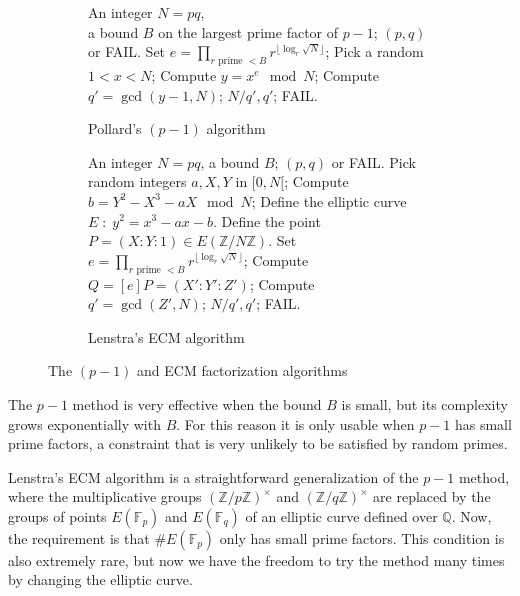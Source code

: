 \documentclass[10pt]{article}
\theoremstyle{plain}
\theoremstyle{definition}
\def\F{\ensuremath{\mathbb{F}}}
\begin{document}
\begin{figure}
  \begin{subfigure}{0.45\textwidth}
    \begin{algorithmic}[1]
      \REQUIRE An integer $N=pq$,\\
      a bound $B$ on the largest prime factor of $p-1$;
      \ENSURE $(p,q)$ or FAIL.
      \STATE Set $e = \prod_{r \text{ prime } < B} r^{\lfloor\log_r\sqrt{N}\rfloor}$;
      \STATE Pick a random $1 < x < N$;
      \STATE Compute $y = x^e \mod N$;
      \STATE Compute $q' = \gcd(y-1, N)$;
      \RETURN $N/q', q'$;
      \ELSE
      \RETURN FAIL.
      \ENDIF
    \end{algorithmic}
    
    \caption{Pollard's $(p-1)$ algorithm}
    \label{fig:p-1}
  \end{subfigure}
  \hfill
  \begin{subfigure}{0.45\textwidth}
    \begin{algorithmic}[1]
      \REQUIRE An integer $N=pq$, a bound $B$;
      \ENSURE $(p,q)$ or FAIL.
      \STATE Pick random integers $a,X,Y$ in $[0,N[$;
      \STATE Compute $b = Y^2 - X^3 - aX \mod N$;
      \STATE Define the elliptic curve $E \;:\; y^2 = x^3 - ax - b$.
      \STATE Define the point $P=(X:Y:1) ∈ E(ℤ/Nℤ)$.
      \STATE Set $e = \prod_{r \text{ prime } < B} r^{\lfloor\log_r\sqrt{N}\rfloor}$;
      \STATE Compute $Q = [e]P = (X':Y':Z')$;
      \STATE Compute $q' = \gcd(Z', N)$;
      \RETURN $N/q', q'$;
      \ELSE
      \RETURN FAIL.
      \ENDIF
    \end{algorithmic}
    
    \caption{Lenstra's ECM algorithm}
    \label{fig:ecm}
  \end{subfigure}
  \caption{The $(p-1)$ and ECM factorization algorithms}
\end{figure}

The $p-1$ method is very effective when the bound $B$ is small, but
its complexity grows exponentially with $B$. %
For this reason it is only usable when $p-1$ has small prime factors,
a constraint that is very unlikely to be satisfied by random primes.

Lenstra's ECM algorithm is a straightforward generalization of the
$p-1$ method, where the multiplicative groups $(ℤ/pℤ)^{×}$ and
$(ℤ/qℤ)^{×}$ are replaced by the groups of points $E(\F_p)$ and
$E(\F_q)$ of an elliptic curve defined over $ℚ$. %
Now, the requirement is that $\#E(\F_p)$ only has small prime
factors. %
This condition is also extremely rare, but now we have the freedom to
try the method many times by changing the elliptic curve. %
\end{document}
